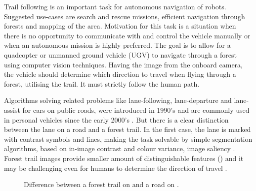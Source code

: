 Trail following is an important task for autonomous navigation of robots. Suggested use-cases are search and rescue missions, efficient navigation through forests and mapping of the area. Motivation for this task is a situation when there is no opportunity to communicate with and control the vehicle manually or when an autonomous mission is highly preferred. The goal is to allow for a quadcopter or unmanned ground vehicle (UGV) to navigate through a forest using computer vision techniques. Having the image from the onboard camera, the vehicle should determine which direction to travel when flying through a forest, utilising the trail. It must strictly follow the human path.

Algorithms solving related problems like lane-following, lane-departure and lane-assist for cars on public roads, were introduced in 1990's \cite{batavia1999driver} and are commonly used in personal vehicles since the early 2000's \cite{chen2020lane}. But there is a clear distinction between the lane on a road and a forest trail. In the first case, the lane is marked with contrast symbols and lines, making the task solvable by simple segmentation algorithms, based on in-image contrast and colour variance, image saliency \cite{santana2013tracking}. Forest trail images provide smaller amount of distinguishable features () and it may be challenging even for humans to determine the direction of travel \cite{giusti2016machine}.

\begin{figure}[!h]
  \centering
  \caption{Difference between a forest trail on  and a road on .}
  \label{fig:features_difference}
\end{figure}


